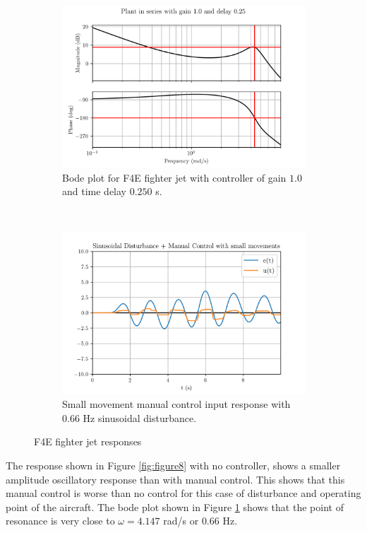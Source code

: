 \documentclass[8pt]{article}
\begin{document}
\begin{figure}[H]
    \begin{subfigure}[t]{0.48\textwidth}
        \centering
        \includegraphics[width=1\textwidth]{figures/FIGURE_9.png}
        \caption{Bode plot for F4E fighter jet with controller of gain $1.0$ and time delay $0.250$ s.}
        \label{fig:figure9}
    \end{subfigure}
    ~
    \begin{subfigure}[t]{0.48\textwidth}
        \centering
        \includegraphics[width=1\textwidth]{figures/FIGURE_10.png}
        \caption{Small movement manual control input response with $0.66$ Hz sinusoidal disturbance.}
        \label{fig:figure10}
    \end{subfigure}
    \caption{F4E fighter jet responses}
\end{figure}

The response shown in Figure \ref{fig:figure8} with no controller, shows a smaller amplitude oscillatory response than with manual control.
This shows that this manual control is worse than no control for this case of disturbance and operating point of the aircraft.
The bode plot shown in Figure \ref{fig:figure9} shows that the point of resonance is very close to $\omega = 4.147$ rad/s or $0.66$ Hz.
\end{document}
